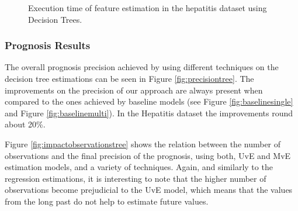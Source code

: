 \begin{figure}[h]
	\begin{subfigmatrix}{2}
	\end{subfigmatrix}
	\caption{Execution time of feature estimation in the hepatitis dataset using Decision Trees.}
	\label{fig:estimationtimetree}
\end{figure}


\subsubsection{Prognosis Results}
\label{subsubsection:prognosis_dt}

The overall prognosis precision achieved by using different techniques on the decision tree estimations can be seen in Figure \ref{fig:precisiontree}.
The improvements on the precision of our approach are always present when compared to the ones achieved by baseline models 
(see Figure \ref{fig:baselinesingle} and Figure \ref{fig:baselinemulti}). In the Hepatitis dataset the improvements round about 20\%.

Figure \ref{fig:impactobservationstree} shows the relation between the number of observations and the final precision of the prognosis, using both, UvE and MvE estimation models, and a variety of techniques. Again, and similarly to the regression estimations, it is interesting to note that the higher number of observations become prejudicial to the UvE model, which means that the values from the long past do not help to estimate future values. 

